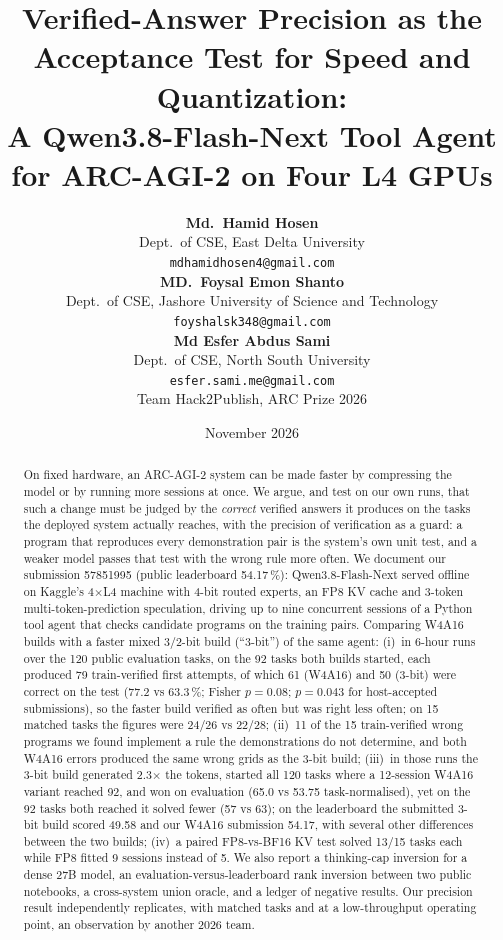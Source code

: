 \documentclass[11pt]{article}
\title{Verified-Answer Precision as the Acceptance Test for Speed and Quantization:\\
A Qwen3.8-Flash-Next Tool Agent for ARC-AGI-2 on Four L4 GPUs}
\author{\textbf{Md.\ Hamid Hosen}\\
Dept.\ of CSE, East Delta University\\
\texttt{mdhamidhosen4@gmail.com}\\[8pt]
\textbf{MD.\ Foysal Emon Shanto}\\
Dept.\ of CSE, Jashore University of Science and Technology\\
\texttt{foyshalsk348@gmail.com}\\[8pt]
\textbf{Md Esfer Abdus Sami}\\
Dept.\ of CSE, North South University\\
\texttt{esfer.sami.me@gmail.com}\\[10pt]
\small Team Hack2Publish, ARC Prize 2026}
\date{November 2026}
\begin{document}
\maketitle

\begin{abstract}
On fixed hardware, an ARC-AGI-2 system can be made faster by compressing the model or by running more sessions at once.
We argue, and test on our own runs, that such a change must be judged by the \emph{correct} verified answers it produces on the tasks the deployed system actually reaches, with the precision of verification as a guard: a program that reproduces every demonstration pair is the system's own unit test, and a weaker model passes that test with the wrong rule more often.
We document our submission 57851995 (public leaderboard 54.17\,\%): Qwen3.8-Flash-Next served offline on Kaggle's 4$\times$L4 machine with 4-bit routed experts, an FP8 KV cache and 3-token multi-token-prediction speculation, driving up to nine concurrent sessions of a Python tool agent that checks candidate programs on the training pairs.
Comparing W4A16 builds with a faster mixed 3/2-bit build (``3-bit'') of the same agent:
(i)~in 6-hour runs over the 120 public evaluation tasks, on the 92 tasks both builds started, each produced 79 train-verified first attempts, of which 61 (W4A16) and 50 (3-bit) were correct on the test (77.2 vs 63.3\,\%; Fisher $p=0.08$; $p=0.043$ for host-accepted submissions), so the faster build verified as often but was right less often; on 15 matched tasks the figures were 24/26 vs 22/28;
(ii)~11 of the 15 train-verified wrong programs we found implement a rule the demonstrations do not determine, and both W4A16 errors produced the same wrong grids as the 3-bit build;
(iii)~in those runs the 3-bit build generated 2.3$\times$ the tokens, started all 120 tasks where a 12-session W4A16 variant reached 92, and won on evaluation (65.0 vs 53.75 task-normalised), yet on the 92 tasks both reached it solved fewer (57 vs 63); on the leaderboard the submitted 3-bit build scored 49.58 and our W4A16 submission 54.17, with several other differences between the two builds;
(iv)~a paired FP8-vs-BF16 KV test solved 13/15 tasks each while FP8 fitted 9 sessions instead of 5.
We also report a thinking-cap inversion for a dense 27B model, an evaluation-versus-leaderboard rank inversion between two public notebooks, a cross-system union oracle, and a ledger of negative results.
Our precision result independently replicates, with matched tasks and at a low-throughput operating point, an observation by another 2026 team.
\end{abstract}
\end{document}
